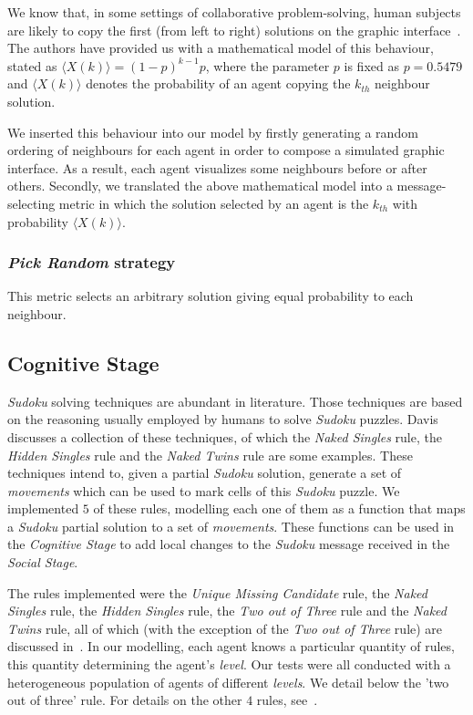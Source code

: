 \documentclass{article}
\begin{document}
We know that, in some settings of collaborative problem-solving, human subjects are likely to copy the first (from left to right) solutions on the graphic interface~\cite{farenzena:collabem}. The authors have provided us with a mathematical model of this behaviour, stated as $\langle X(k)\rangle = (1-p)^{k-1}p$, where the parameter $p$ is fixed as $p = 0.5479$ and $\langle X(k)\rangle$ denotes the probability of an agent copying the $k_{th}$ neighbour solution.

We inserted this behaviour into our model by firstly generating a random ordering of neighbours for each agent in order to compose a simulated graphic interface. As a result, each agent visualizes some neighbours before or after others. Secondly, we translated the above mathematical model into a message-selecting metric in which the solution selected by an agent is the $k_{th}$ with probability $\langle X(k)\rangle$.

\subsubsection{{\em Pick Random} strategy}

This metric selects an arbitrary solution giving equal probability to each neighbour.

\subsection{Cognitive Stage}

{\em Sudoku} solving techniques are abundant in literature. %
Those techniques are based on the reasoning usually employed by humans to solve \emph{Sudoku} puzzles. Davis~\cite{davis:mathsudoku} discusses a collection of these techniques, of which the {\em Naked Singles} rule, the {\em Hidden Singles} rule and the {\em Naked Twins} rule are some examples. These techniques intend to, given a partial {\em Sudoku} solution, generate a set of {\em movements} which can be used to mark cells of this {\em Sudoku} puzzle. We implemented $5$ of these rules, modelling each one of them as a function that maps a {\em Sudoku} partial solution to a set of {\em movements}. These functions can be used in the {\em Cognitive Stage} to add local changes to the {\em Sudoku} message received in the {\em Social Stage}.

The rules implemented were the {\em Unique Missing Candidate} rule, the {\em Naked Singles} rule, the {\em Hidden Singles} rule, the {\em Two out of Three} rule and the {\em Naked Twins} rule, all of which (with the exception of the {\em Two out of Three} rule) are discussed in~\cite{davis:mathsudoku}. In our modelling, each agent knows a particular quantity of rules, this quantity determining the agent's {\em level}. Our tests were all conducted with a heterogeneous population of agents of different {\em levels}. We detail below the 'two out of three' rule. For details on the other $4$ rules, see~\cite{davis:mathsudoku}.
\end{document}
